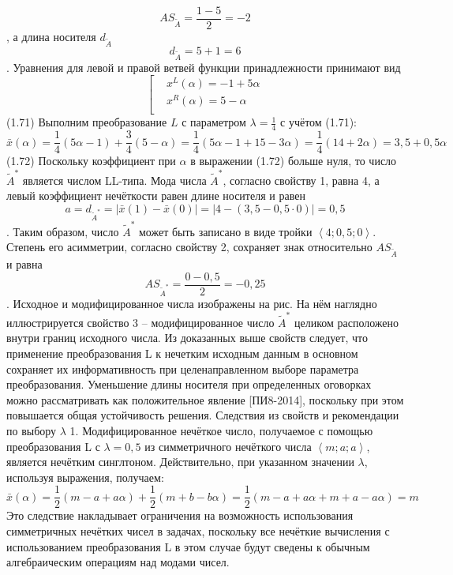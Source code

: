 	\[A{{S}_{{\tilde{A}}}}=\frac{1-5}{2}=-2\],
а длина носителя ${{d}_{{\tilde{A}}}}$
	\[{{d}_{{\tilde{A}}}}=5+1=6\].
Уравнения для левой и правой ветвей функции принадлежности принимают вид
	\[\left[ \begin{aligned}
  & {{x}^{L}}\left( \alpha  \right)=-1+5\alpha  \\ 
 & {{x}^{R}}\left( \alpha  \right)=5-\alpha  \\ 
\end{aligned} \right.\] 	(1.71)
Выполним преобразование $L$ с параметром $\lambda =\frac{1}{4}$ с учётом (1.71):
	\[\bar{x}\left( \alpha  \right)=\frac{1}{4}\left( 5\alpha -1 \right)+\frac{3}{4}\left( 5-\alpha  \right)=\frac{1}{4}\left( 5\alpha -1+15-3\alpha  \right)=\frac{1}{4}\left( 14+2\alpha  \right)=3,5+0,5\alpha \] 	(1.72)
Поскольку коэффициент при $\alpha $ в выражении (1.72) больше нуля, то число ${{\tilde{A}}^{*}}$ является числом LL-типа. Мода числа ${{\tilde{A}}^{*}}$, согласно свойству 1, равна 4, а левый коэффициент нечёткости равен длине носителя и равен
	\[a={{d}_{{{{\tilde{A}}}^{*}}}}=\left| \bar{x}\left( 1 \right)-\bar{x}\left( 0 \right) \right|=\left| 4-\left( 3,5-0,5\cdot 0 \right) \right|=0,5\].
Таким образом, число ${{\tilde{A}}^{*}}$ может быть записано в виде тройки $\left\langle 4;0,5;0 \right\rangle $. Степень его асимметрии, согласно свойству 2, сохраняет знак относительно $A{{S}_{{\tilde{A}}}}$ и равна
	\[A{{S}_{{{{\tilde{A}}}^{*}}}}=\frac{0-0,5}{2}=-0,25\].
Исходное и модифицированное числа изображены на рис. На нём наглядно иллюстрируется свойство 3 – модифицированное число ${{\tilde{A}}^{*}}$ целиком расположено внутри границ исходного числа.
Из доказанных выше свойств следует, что применение преобразования L к нечетким исходным данным в основном сохраняет их информативность при целенаправленном выборе параметра преобразования. Уменьшение длины носителя при определенных оговорках можно рассматривать как положительное явление [ПИ8-2014], поскольку при этом повышается общая устойчивость решения.
Следствия из свойств и рекомендации по выбору $\lambda $ 
1. Модифицированное нечёткое число, получаемое с помощью преобразования L с $\lambda =0,5$ из симметричного нечёткого числа $\left\langle m;a;a \right\rangle $, является нечётким синглтоном.
Действительно, при указанном значении $\lambda $, используя выражения, получаем:
	\[\bar{x}\left( \alpha  \right)=\frac{1}{2}\left( m-a+a\alpha  \right)+\frac{1}{2}\left( m+b-b\alpha  \right)=\frac{1}{2}\left( m-a+a\alpha +m+a-a\alpha  \right)=m\] 
Это следствие накладывает ограничения на возможность использования симметричных нечётких чисел в задачах, поскольку все нечёткие вычисления с использованием преобразования L в этом случае будут сведены к обычным алгебраическим операциям над модами чисел.
